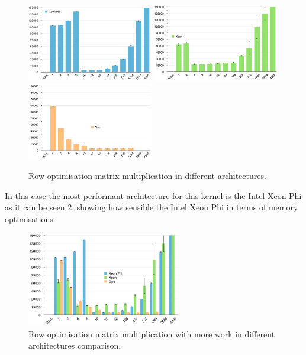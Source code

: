 \begin{figure}[!h]
    \centering
    \includegraphics[width=0.49\textwidth]{figures/opt2_phi.png}
    \includegraphics[width=0.49\textwidth]{figures/opt2_cpu.png}
    \includegraphics[width=0.49\textwidth]{figures/opt2_gpu.png}
    \caption{Row optimisation matrix multiplication in different architectures.}
    \label{Rows}
\end{figure}


\par{In this case the most performant architecture for this kernel is the Intel Xeon Phi as it can be seen \ref{RowsComp}, 
    showing how sensible the Intel Xeon Phi in terms of memory optimisations.}

\begin{figure}[!h]
    \centering
    \includegraphics[width=0.6\textwidth]{figures/opt2_comp.png}
    \caption{Row optimisation matrix multiplication with more work in different architectures comparison.}
    \label{RowsComp}
\end{figure}

